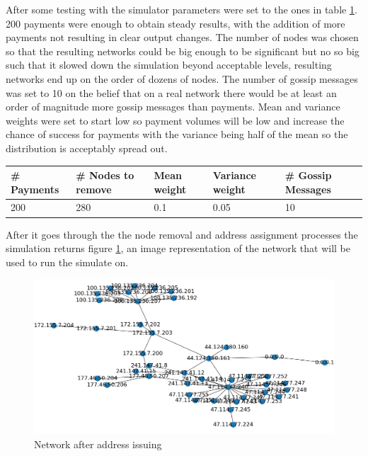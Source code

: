 After some testing with the simulator parameters were set to the ones in table \ref{table:simulation_params1}. 200 payments  were enough to obtain steady results, with the addition of more payments not resulting in clear output changes. The number of nodes was chosen so that the resulting networks could be big enough to be significant but no so big such that it slowed down the simulation beyond acceptable levels, resulting networks end up
on the order of dozens of nodes. The number of gossip messages was set to 10 on the belief that on a real network there would be at least an order of magnitude more gossip messages than payments. Mean and variance weights were set to start low so payment volumes will be low and increase the chance of success for payments with the variance being half of the mean so the distribution is acceptably spread out.

\begin{table}[H]
\begin{tabular}{|l|l|l|l|l|}
\hline
\rowcolor[HTML]{C0C0C0} 
\# Payments & \# Nodes to remove & Mean weight & Variance weight & \# Gossip Messages\\ \hline
200 & 280 & 0.1 & 0.05 & 10\\ \hline
\end{tabular}
\label{table:simulation_params1}
\end{table}

After it goes through the the node removal and address assignment processes the simulation returns figure \ref{fig:sim_net_addr}, an image representation of the network that will be used to run the simulate on.

\begin{figure}[H]
\begin{center}
  \includegraphics[width=\linewidth]{images/sim_net_addr.png}
  \caption{Network after address issuing}
  \label{fig:sim_net_addr}
  \end{center}
\end{figure}

